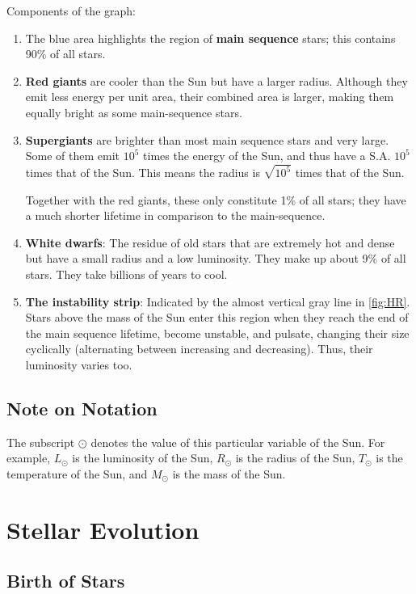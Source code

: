 \documentclass[a4paper,12pt]{article}
\let\oldsection\section
\renewcommand\section{\clearpage\oldsection}
\begin{document}
Components of the graph:
\begin{enumerate}
  \item The blue area highlights the region of \textbf{main sequence} stars; this contains 90\% of all stars.
  \item \textbf{Red giants} are cooler than the Sun but have a larger radius. Although they emit less energy per unit area, their combined area is larger, making them equally bright as some main-sequence stars.
  \item \textbf{Supergiants} are brighter than most main sequence stars and very large. Some of them emit $10^5$ times the energy of the Sun, and thus have a S.A. $10^5$ times that of the Sun. This means the radius is $\sqrt{10^5}$ times that of the Sun.

        Together with the red giants, these only constitute 1\% of all stars; they have a much shorter lifetime in comparison to the main-sequence.
  \item \textbf{White dwarfs}: The residue of old stars that are extremely hot and dense but have a small radius and a low luminosity. They make up about 9\% of all stars. They take billions of years to cool.
  \item \textbf{The instability strip}: Indicated by the almost vertical gray line in \cref{fig:HR}. Stars above the mass of the Sun enter this region when they reach the end of the main sequence lifetime, become unstable, and pulsate, changing their size cyclically (alternating between increasing and decreasing). Thus, their luminosity varies too.
\end{enumerate}

\subsection{Note on Notation}

The subscript $\odot$ denotes the value of this particular variable of the Sun. For example, $L_{\odot}$ is the luminosity of the Sun, $R_{\odot}$ is the radius of the Sun, $T_{\odot}$ is the temperature of the Sun, and $M_{\odot}$ is the mass of the Sun.

\section{Stellar Evolution}

\subsection{Birth of Stars}
\end{document}
